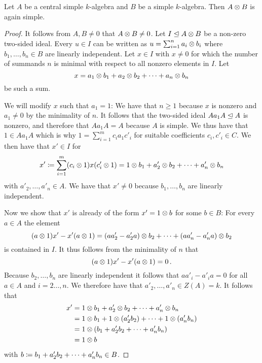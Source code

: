 \begin{lemma}
  \label{lemma: tensor product is again simple}
  Let $A$ be a central simple $k$-algebra and $B$ be a simple $k$-algebra.
  Then $A \mathbin{\otimes} B$ is again simple.
\end{lemma}


\begin{proof}
  It follows from $A, B \neq 0$ that $A \mathbin{\otimes} B \neq 0$.
  Let $I \trianglelefteq A \mathbin{\otimes} B$ be a non-zero two-sided ideal.
  Every $u \in I$ can be written as $u = \sum_{i=1}^n a_i \mathbin{\otimes} b_i$ where $b_1, \dotsc, b_n \in B$ are linearly independent.
  Let $x \in I$ with $x \neq 0$ for which the number of summands $n$ is minimal with respect to all nonzero elements in $I$.
  Let
  \begin{equation}
    \label{eqn: u as a sum}
      x
    = a_1 \mathbin{\otimes} b_1 + a_2 \mathbin{\otimes} b_2 + \dotsb + a_n \mathbin{\otimes} b_n
  \end{equation}
  be such a sum.
  
  We will modify $x$ such that $a_1 = 1$:
  We have that $n \geq 1$ because $x$ is nonzero and $a_1 \neq 0$ by the minimality of $n$.
  It follows that the two-sided ideal $A a_1 A \trianglelefteq A$ is nonzero, and therefore that $A a_1 A = A$ because $A$ is simple.
  We thus have that $1 \in A a_1 A$ which is why $1 = \sum_{i=1}^m c_i a_1 c'_i$ for suitable coefficients $c_i, c'_i \in C$.
  We then have that $x' \in I$ for
  \[
              x'
    \coloneqq  \sum_{i=1}^m (c_i \mathbin{\otimes} 1) x (c'_i \mathbin{\otimes} 1)
    =         1 \mathbin{\otimes} b_1 + a'_2 \mathbin{\otimes} b_2 + \dotsb + a'_n \mathbin{\otimes} b_n
  \]
  with $a'_2, \dotsc, a'_n \in A$.
  We have that $x' \neq 0$ because $b_1, \dotsc, b_n$ are linearly independent.
  
  Now we show that $x'$ is already of the form $x' = 1 \mathbin{\otimes} b$ for some $b \in B$:
  For every $a \in A$ the element
  \[
        (a \mathbin{\otimes} 1) x' - x' (a \mathbin{\otimes} 1)
    =     (a a'_2 - a'_2 a) \mathbin{\otimes} b_2
        + \dotsb
        + (a a'_n - a'_n a) \mathbin{\otimes} b_2
  \]
  is contained in $I$.
  It thus follows from the minimality of $n$ that
  \[
      (a \mathbin{\otimes} 1) x' - x' (a \mathbin{\otimes} 1)
    = 0 \,.
  \]
  Because $b_2, \dotsc, b_n$ are linearly independent it follows that $a a'_i - a'_i a = 0$ for all $a \in A$ and $i = 2 \dotsc, n$.
  We therefore have that $a'_2, \dotsc, a'_n \in Z(A) = k$.
  It follows that
  \begin{align*}
        x'
    &=  1 \mathbin{\otimes} b_1 + a'_2 \mathbin{\otimes} b_2 + \dotsb + a'_n \mathbin{\otimes} b_n  \\
    &=  1 \mathbin{\otimes} b_1 + 1 \mathbin{\otimes} (a'_2 b_2) + \dotsb + 1 \mathbin{\otimes} (a'_n b_n)  \\
    &=  1 \mathbin{\otimes} (b_1 + a'_2 b_2 + \dotsb + a'_n b_n)  \\
    &=  1 \mathbin{\otimes} b
  \end{align*}
  with $b \coloneqq b_1 + a'_2 b_2 + \dotsb + a'_n b_n \in B$.
  

\end{proof}
